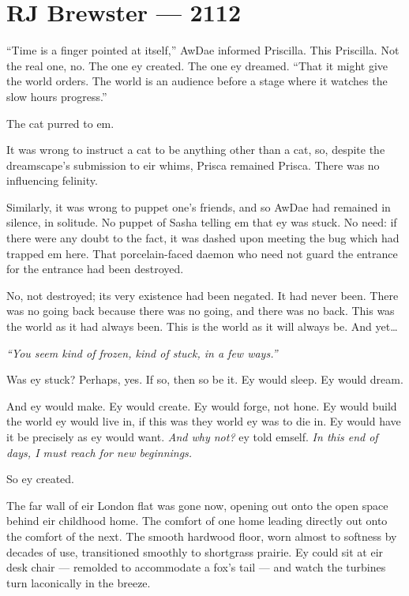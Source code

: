 \hypertarget{rj-brewster-2112}{%
\chapter*{RJ Brewster — 2112}\label{rj-brewster-2112}}

``Time is a finger pointed at itself,'' AwDae informed Priscilla. This Priscilla. Not the real one, no. The one ey created. The one ey dreamed. ``That it might give the world orders. The world is an audience before a stage where it watches the slow hours progress.''

The cat purred to em.

It was wrong to instruct a cat to be anything other than a cat, so, despite the dreamscape's submission to eir whims, Prisca remained Prisca. There was no influencing felinity.

Similarly, it was wrong to puppet one's friends, and so AwDae had remained in silence, in solitude. No puppet of Sasha telling em that ey was stuck. No need: if there were any doubt to the fact, it was dashed upon meeting the bug which had trapped em here. That porcelain-faced daemon who need not guard the entrance for the entrance had been destroyed.

No, not destroyed; its very existence had been negated. It had never been. There was no going back because there was no going, and there was no back. This was the world as it had always been. This is the world as it will always be. And yet\ldots{}

\emph{``You seem kind of frozen, kind of stuck, in a few ways.''}

Was ey stuck? Perhaps, yes. If so, then so be it. Ey would sleep. Ey would dream.

And ey would make. Ey would create. Ey would forge, not hone. Ey would build the world ey would live in, if this was they world ey was to die in. Ey would have it be precisely as ey would want. \emph{And why not?} ey told emself. \emph{In this end of days, I must reach for new beginnings.}

So ey created.

The far wall of eir London flat was gone now, opening out onto the open space behind eir childhood home. The comfort of one home leading directly out onto the comfort of the next. The smooth hardwood floor, worn almost to softness by decades of use, transitioned smoothly to shortgrass prairie. Ey could sit at eir desk chair — remolded to accommodate a fox's tail — and watch the turbines turn laconically in the breeze.

